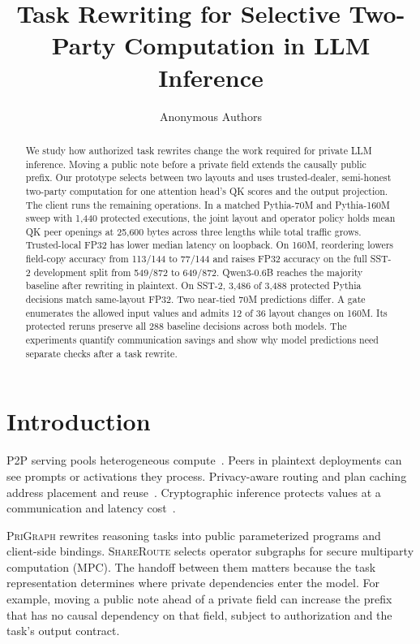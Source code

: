 \documentclass[runningheads]{llncs}
\title{Task Rewriting for Selective Two-Party Computation in LLM Inference}
\author{Anonymous Authors}
\institute{Anonymous Institution}
\newcommand{\srcA}{\textsc{PriGraph}}
\newcommand{\srcB}{\textsc{ShareRoute}}
\begin{document}
\maketitle
\begin{abstract}
We study how authorized task rewrites change the work required for
private LLM inference. Moving a public note before a private field extends
the causally public prefix. Our prototype selects between two layouts and
uses trusted-dealer, semi-honest two-party computation for one attention
head's QK scores and the output projection. The client runs the remaining
operations. In a matched Pythia-70M and Pythia-160M sweep with 1,440
protected executions, the joint layout and operator policy holds mean
QK peer openings at 25,600 bytes across three lengths while total traffic
grows. Trusted-local FP32 has lower median latency on loopback. On 160M,
reordering lowers field-copy accuracy from 113/144 to 77/144 and raises
FP32 accuracy on the full SST-2 development split from 549/872 to 649/872.
Qwen3-0.6B reaches the majority baseline after rewriting in plaintext.
On SST-2, 3,486 of 3,488 protected Pythia decisions match same-layout FP32.
Two near-tied 70M predictions differ. A gate
enumerates the allowed input values and admits 12 of 36 layout changes on
160M. Its protected reruns preserve all 288 baseline decisions across
both models. The experiments quantify communication savings and show
why model predictions need separate checks after a task rewrite.
\end{abstract}

\section{Introduction}
P2P serving pools heterogeneous compute~\cite{petals,planetserve}.
Peers in plaintext deployments can see prompts or activations they process.
Privacy-aware routing and plan caching address placement and
reuse~\cite{ppmi,prism,apc}.
Cryptographic inference protects values at a communication and latency
cost~\cite{bolt,puma}.

\srcA{} rewrites reasoning tasks into public parameterized programs and
client-side bindings. \srcB{} selects operator subgraphs for secure
multiparty computation (MPC). The handoff between them matters because the
task representation determines where private dependencies enter the model.
For example, moving a public note ahead of a private field can increase the
prefix that has no causal dependency on that field, subject to authorization
and the task's output contract.
\end{document}
